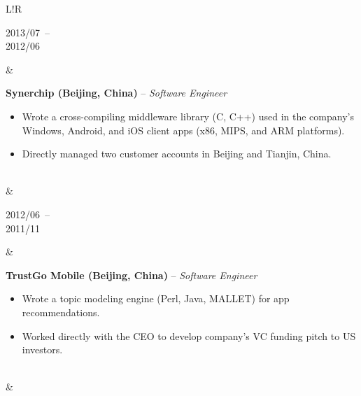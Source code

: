 \documentclass[10pt]{article}
\newcommand\VRule{\color{lightgray}\vrule width 0.5pt}
\def\spaceBetweenExperienceEntries{\vspace{8pt}&\vspace{8pt}\\}
\def\spaceBeforeExperienceBullets{\vspace{-10pt}}
\begin{document}
\begin{CJK}{UTF8}{gbsn}
\begin{tabular}{L!{\VRule}R}
    \parbox[t]{1.0\linewidth}{
        {\scriptsize 2013/07}~--\\
        {\scriptsize 2012/06}
    }&
    \parbox[t]{1.0\linewidth}{
        {\bf Synerchip (Beijing, China)} -- \textit{Software Engineer}\\
        \spaceBeforeExperienceBullets
        \begin{itemize}[leftmargin=16pt]
            \item Wrote a cross-compiling middleware library (C, C++) used in the company's Windows, Android, and iOS client apps (x86, MIPS, and ARM platforms).
            \item Directly managed two customer accounts in Beijing and Tianjin, China.
        \end{itemize}
    }\\

    \spaceBetweenExperienceEntries

    \parbox[t]{1.0\linewidth}{
        {\scriptsize 2012/06}~--\\
        {\scriptsize 2011/11}
    }&
    \parbox[t]{1.0\linewidth}{
        {\bf TrustGo Mobile (Beijing, China)} -- \textit{Software Engineer}\\
        \spaceBeforeExperienceBullets
        \begin{itemize}[leftmargin=16pt]
            \item Wrote a topic modeling engine (Perl, Java, MALLET) for app recommendations.
            \item Worked directly with the CEO to develop company's VC funding pitch to US investors.
        \end{itemize}
    }\\

    \spaceBetweenExperienceEntries


\end{tabular}
\end{CJK}
\end{document}
